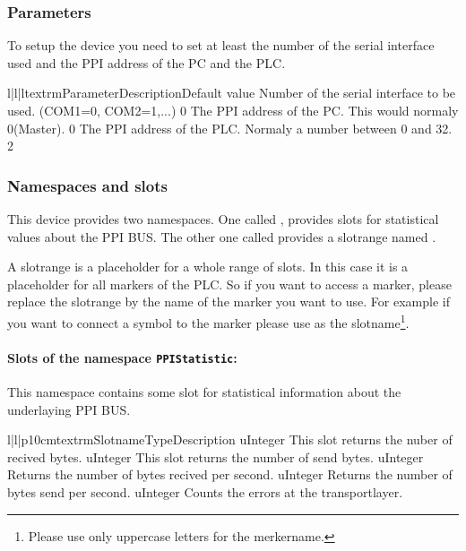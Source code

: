 \subsubsection{Parameters}
To setup the device you need to set at least the number of the serial 
interface used and the PPI address of the PC and the PLC.
\begin{tableiii}{l|l|l}{textrm}{Parameter}{Description}{Default value}
        {Number of the serial interface to be used. (COM1=0, COM2=1,...)}
        {0}
        {The PPI address of the PC. This would normaly 0(Master).}
        {0}
        {The PPI address of the PLC. Normaly a number between 0 and 32.}
        {2}
\end{tableiii}

\subsubsection{Namespaces and slots}
This device provides two namespaces. One called , provides
slots for statistical values about the PPI BUS. The other one called 
 provides a slotrange named .

A slotrange is a placeholder for a whole range of slots. In this case it
is a placeholder for all markers of the PLC. So if you want to access a
marker, please replace the slotrange by the name of the marker you want 
to use. For example if you want to connect a symbol to the marker
 please use  as the 
slotname\footnote{Please use only uppercase letters for the merkername.}. 


\paragraph{Slots of the namespace \texttt{PPIStatistic}:}
This namespace contains some slot for statistical information about the 
underlaying PPI BUS. 
\begin{tableiii}{l|l|p{10cm}}{textrm}{Slotname}{Type}{Description}
        {uInteger}
        {This slot returns the nuber of recived bytes.}
        {uInteger}
        {This slot returns the number of send bytes.}
        {uInteger}
        {Returns the number of bytes recived per second.}
        {uInteger}
        {Returns the number of bytes send per second.}
        {uInteger}
        {Counts the errors at the transportlayer.}
\end{tableiii}


